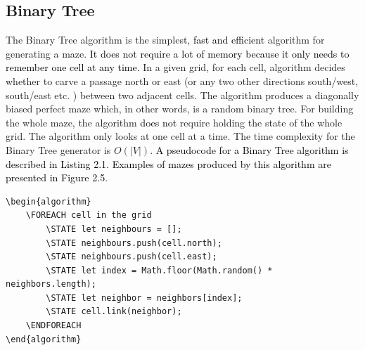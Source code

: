 \subsection{Binary Tree}
The Binary Tree algorithm \textcolor{black}{\cite{16}} is the simplest, \textcolor{black}{fast and efficient} algorithm for generating a maze. \textcolor{black}{It does not require a lot of memory because it only needs to remember one cell at any time.} In a given grid, for each cell, algorithm decides whether to carve a passage north or east (or any two other directions south/west, south/east etc. ) between two adjacent cells. The algorithm produces a diagonally biased perfect maze which, in other words, is a random binary tree. For building the whole maze, the algorithm \textcolor{black}{does not} require holding the state of the whole grid. The algorithm only looks at one cell at a time. The time complexity for the Binary Tree generator is $O(|V|)$. \textcolor{black}{A pseudocode for a Binary Tree algorithm is described in Listing 2.1. Examples of mazes produced by this algorithm are presented in Figure 2.5}.
\newline
\begin{lstlisting}[caption={Pseudocode for a Binary Tree Algorithm. Developped by the author, based on ~\cite{16}.}]
\begin{algorithm}
	\FOREACH cell in the grid
		\STATE let neighbours = [];
		\STATE neighbours.push(cell.north);
		\STATE neighbours.push(cell.east);
		\STATE let index = Math.floor(Math.random() * neighbors.length);
		\STATE let neighbor = neighbors[index];
		\STATE cell.link(neighbor);
	\ENDFOREACH	
\end{algorithm}
\end{lstlisting}
\\
\newline
